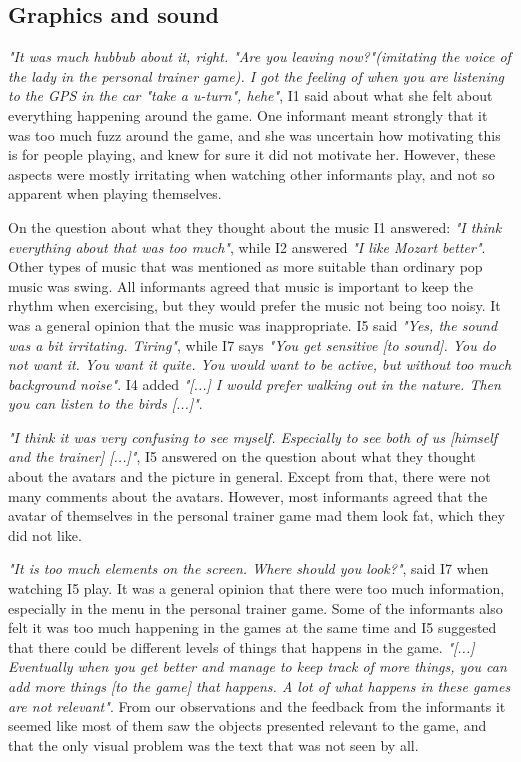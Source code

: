 \subsection{Graphics and sound}
\emph{"It was much hubbub about it, right. "Are you leaving now?"(imitating the voice of the lady in the personal trainer game). I got the feeling of when you are listening to the GPS in the car "take a u-turn", hehe"}, I1 said about what she felt about everything happening around the game. One informant meant strongly that it was too much fuzz around the game, and she was uncertain how motivating this is for people playing, and knew for sure it did not motivate her. However, these aspects were mostly irritating when watching other informants play, and not so apparent when playing themselves. 

On the question about what they thought about the music I1 answered: \emph{"I think everything about that was too much"}, while I2 answered \emph{"I like Mozart better"}. Other types of music that was mentioned as more suitable than ordinary pop music was swing. All informants agreed that music is important to keep the rhythm when exercising, but they would prefer the music not being too noisy. It was a general opinion that the music was inappropriate.  I5 said \emph{"Yes, the sound was a bit irritating. Tiring"}, while I7 says \emph{"You get sensitive [to sound]. You do not want it. You want it quite. You would want to be active, but without too much background noise"}. I4 added \emph{"[...] I would prefer walking out in the nature. Then you can listen to the birds [...]"}.

\emph{"I think it was very confusing to see myself. Especially to see both of us [himself and the trainer] [...]"}, I5 answered on the question about what they thought about the avatars and the picture in general. Except from that, there were not many comments about the avatars. However, most informants agreed that the avatar of themselves in the personal trainer game mad them look fat, which they did not like. 

\emph{"It is too much elements on the screen. Where should you look?"}, said I7 when watching I5 play. It was a general opinion that there were too much information, especially in the menu in the personal trainer game. Some of the informants also felt it was too much happening in the games at the same time and I5 suggested that there could be different levels of things that happens in the game. \emph{"[...] Eventually when you get better and manage to keep track of more things, you can add more things [to the game] that happens. A lot of what happens in these games are not relevant"}. From our observations and the feedback from the informants it seemed like most of them saw the objects presented relevant to the game, and that the only visual problem was the text that was not seen by all.

